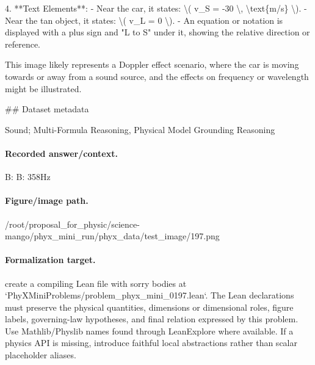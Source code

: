 4. **Text Elements**:
   - Near the car, it states: \textbackslash{}( v\_S = -30 \textbackslash{}, \textbackslash{}text\{m/s\} \textbackslash{}).
   - Near the tan object, it states: \textbackslash{}( v\_L = 0 \textbackslash{}).
   - An equation or notation is displayed with a plus sign and "L to S" under it, showing the relative direction or reference.

This image likely represents a Doppler effect scenario, where the car is moving towards or away from a sound source, and the effects on frequency or wavelength might be illustrated.

\#\# Dataset metadata

Sound; Multi-Formula Reasoning, Physical Model Grounding Reasoning

\paragraph{Recorded answer/context.}
B: B: 358Hz

\paragraph{Figure/image path.}
/root/proposal\_for\_physic/science-mango/phyx\_mini\_run/phyx\_data/test\_image/197.png

\paragraph{Formalization target.}
create a compiling Lean file with sorry bodies at `PhyXMiniProblems/problem\_phyx\_mini\_0197.lean`. The Lean declarations must preserve the physical quantities, dimensions or dimensional roles, figure labels, governing-law hypotheses, and final relation expressed by this problem.
Use Mathlib/Physlib names found through LeanExplore where available. If a physics API is missing, introduce faithful local abstractions rather than scalar placeholder aliases.

